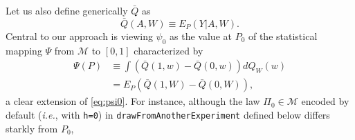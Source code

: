 \documentclass[]{article}
\newcommand{\calM}{\mathcal{M}}
\newcommand{\Qbar}{\bar{Q}}
\theoremstyle{definition}
\theoremstyle{definition}
\theoremstyle{definition}
\theoremstyle{remark}
\begin{document}
Let us also define generically \(\Qbar\) as
\begin{equation*} \Qbar (A,W) \equiv
E_{P} (Y|A, W). \end{equation*} Central to our approach is viewing
\(\psi_{0}\) as the value at \(P_{0}\) of the statistical mapping
\(\Psi\) from \(\calM\) to \([0,1]\) characterized by
\begin{align*}  \Psi(P) &\equiv  \int \left(\Qbar(1,
w) -  \Qbar(0, w)\right) dQ_{W}(w)  \\ &=  E_{P} \left(\Qbar(1, W)  - \Qbar(0,
W)\right), \end{align*} a clear extension of \eqref{eq:psi0}. For
instance, although the law \(\Pi_{0} \in \calM\) encoded by default
(\textit{i.e.}, with \texttt{h=0}) in \texttt{drawFromAnotherExperiment}
defined below differs starkly from \(P_{0}\),
\end{document}
